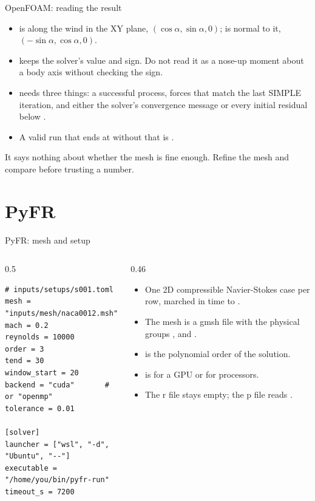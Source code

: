 \begin{frame}{OpenFOAM: reading the result}
\begin{itemize}
  \item {} is along the wind in the XY plane,
        $(\cos\alpha, \sin\alpha, 0)$;  is normal to it,
        $(-\sin\alpha, \cos\alpha, 0)$.
  \item {} keeps the solver's value and sign. Do not read it as
        a nose-up moment about a body axis without checking the sign.
  \item {} needs three things: a successful process, forces
        that match the last SIMPLE iteration, and either the solver's
        convergence message or every initial residual below
        .
  \item A valid run that ends at  without that is
        .
\end{itemize}
\begin{cfdbpitfall}
It says nothing about whether the mesh is fine enough. Refine the mesh and
compare before trusting a number.
\end{cfdbpitfall}
\end{frame}

\section{PyFR}

\begin{frame}[fragile]{PyFR: mesh and setup}
\begin{columns}[T]
\begin{column}{0.5\textwidth}
\begin{lstlisting}[style=cfdbtoml]
# inputs/setups/s001.toml
mesh = "inputs/mesh/naca0012.msh"
mach = 0.2
reynolds = 10000
order = 3
tend = 30
window_start = 20
backend = "cuda"       # or "openmp"
tolerance = 0.01

[solver]
launcher = ["wsl", "-d", "Ubuntu", "--"]
executable = "/home/you/bin/pyfr-run"
timeout_s = 7200
\end{lstlisting}
\end{column}
\begin{column}{0.46\textwidth}
\begin{itemize}\small
  \item One 2D compressible Navier-Stokes case per row, marched in time
        to .
  \item The mesh is a gmsh file with the physical groups ,
         and .
  \item {} is the polynomial order of the solution.
  \item {} is  for a GPU or  for
        processors.
  \item The r file stays empty; the p file reads .
\end{itemize}
\end{column}
\end{columns}
\end{frame}

